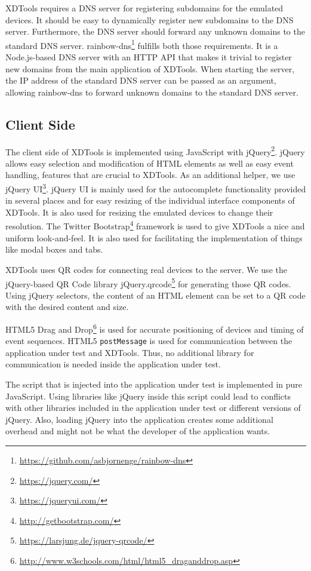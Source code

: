 XDTools requires a DNS server for registering subdomains for the emulated devices. It should be easy to dynamically register new subdomains to the DNS server. Furthermore, the DNS server should forward any unknown domains to the standard DNS server. rainbow-dns\footnote{\url{https://github.com/asbjornenge/rainbow-dns}} fulfills both those requirements. It is a Node.js-based DNS server with an HTTP API that makes it trivial to register new domains from the main application of XDTools. When starting the server, the IP address of the standard DNS server can be passed as an argument, allowing rainbow-dns to forward unknown domains to the standard DNS server.

\subsection{Client Side}

The client side of XDTools is implemented using JavaScript with jQuery\footnote{\url{https://jquery.com/}}. jQuery allows easy selection and modification of HTML elements as well as easy event handling, features that are crucial to XDTools. As an additional helper, we use jQuery UI\footnote{\url{https://jqueryui.com/}}. jQuery UI is mainly used for the autocomplete functionality provided in several places and for easy resizing of the individual interface components of XDTools. It is also used for resizing the emulated devices to change their resolution. The Twitter Bootstrap\footnote{\url{http://getbootstrap.com/}} framework is used to give XDTools a nice and uniform look-and-feel. It is also used for facilitating the implementation of things like modal boxes and tabs. 

XDTools uses QR codes for connecting real devices to the server. We use the jQuery-based QR Code library jQuery.qrcode\footnote{\url{https://larsjung.de/jquery-qrcode/}} for generating those QR codes. Using jQuery selectors, the content of an HTML element can be set to a QR code with the desired content and size.

HTML5 Drag and Drop\footnote{\url{http://www.w3schools.com/html/html5_draganddrop.asp}} is used for accurate positioning of devices and timing of event sequences. HTML5 \lstinline|postMessage| is used for communication between the application under test and XDTools. Thus, no additional library for communication is needed inside the application under test.

The script that is injected into the application under test is implemented in pure JavaScript. Using libraries like jQuery inside this script could lead to conflicts with other libraries included in the application under test or different versions of jQuery. Also, loading jQuery into the application creates some additional overhead and might not be what the developer of the application wants.

